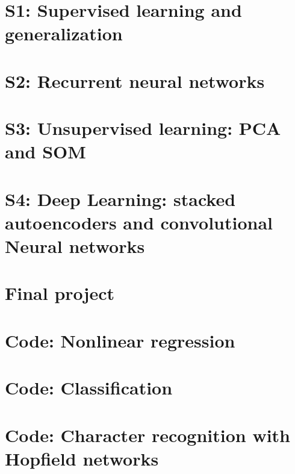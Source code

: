 \documentclass[a4paper,12pt]{article}
\begin{document}
\setlength\parindent{0pt}



\tableofcontents
\newpage
\listoffigures
\listoftables

\newpage
\section{S1: Supervised learning and generalization}


\newpage
\section{S2: Recurrent neural networks}


\newpage
\section{S3: Unsupervised learning: PCA and SOM}


\newpage
\section{S4: Deep Learning: stacked autoencoders and convolutional Neural networks}


\newpage
\section{Final project}



\newpage
\appendix
\section{Code: Nonlinear regression}

\section{Code: Classification}

\section{Code: Character recognition with Hopfield networks}



\end{document}
